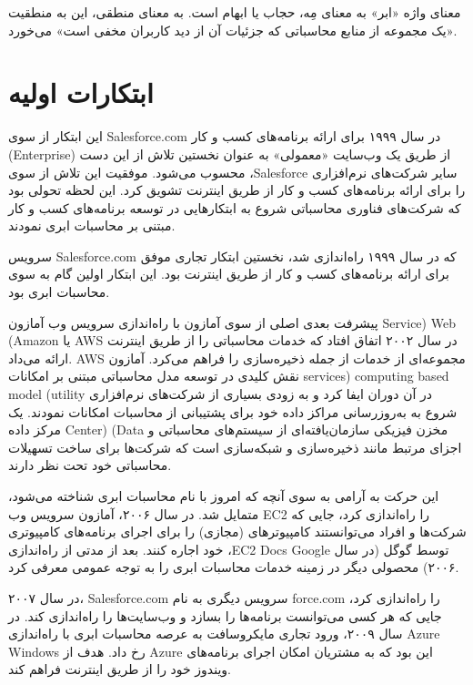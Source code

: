 \documentclass{book}
\begin{document}
            معنای واژه «ابر» به معنای مِه، حجاب یا ابهام است. به معنای منطقی، این به منطقیت «یک مجموعه از منابع محاسباتی که جزئیات آن از دید کاربران مخفی است» می‌خورد.

        \section{ابتکارات اولیه}

            این ابتکار از سوی Salesforce.com در سال ۱۹۹۹ برای ارائه برنامه‌های کسب و کار (Enterprise) از طریق یک وب‌سایت «معمولی» به عنوان نخستین تلاش از این دست محسوب می‌شود. موفقیت این تلاش از سوی ،Salesforce سایر شرکت‌های نرم‌افزاری را برای ارائه برنامه‌های کسب و کار از طریق اینترنت تشویق کرد. این لحظه تحولی بود که شرکت‌های فناوری محاسباتی شروع به ابتکار‌هایی در توسعه برنامه‌های کسب و کار مبتنی بر محاسبات ابری نمودند.

            \begin{addinfo}
                
                سرویس Salesforce.com که در سال ۱۹۹۹ راه‌اندازی شد، نخستین ابتکار تجاری موفق برای ارائه برنامه‌های کسب و کار از طریق اینترنت بود. این ابتکار اولین گام به سوی محاسبات ابری بود.

            \end{addinfo}

            پیشرفت بعدی اصلی از سوی آمازون با راه‌اندازی سرویس وب آمازون Service) Web (Amazon یا AWS در سال ۲۰۰۲ اتفاق افتاد که خدمات محاسباتی را از طریق اینترنت ارائه می‌داد. AWS مجموعه‌ای از خدمات از جمله ذخیره‌سازی را فراهم می‌کرد. آمازون نقش کلیدی در توسعه مدل محاسباتی مبتنی بر امکانات services) computing based model (utility در آن دوران ایفا کرد و به زودی بسیاری از شرکت‌های نرم‌افزاری شروع به به‌روزرسانی مراکز داده خود برای پشتیبانی از محاسبات امکانات نمودند. یک مرکز داده Center) (Data مخزن فیزیکی سازمان‌یافته‌ای از سیستم‌های محاسباتی و اجزای مرتبط مانند ذخیره‌سازی و شبکه‌سازی است که شرکت‌ها برای ساخت تسهیلات محاسباتی خود تحت نظر دارند.

            این حرکت به آرامی به سوی آنچه که امروز با نام محاسبات ابری شناخته می‌شود، متمایل شد. در سال ۲۰۰۶، آمازون سرویس وب EC2 را راه‌اندازی کرد، جایی که شرکت‌ها و افراد می‌توانستند کامپیوترهای (مجازی) را برای اجرای برنامه‌های کامپیوتری خود اجاره کنند. بعد از مدتی از راه‌اندازی ،EC2 Docs Google توسط گوگل (در سال ۲۰۰۶) محصولی دیگر در زمینه خدمات محاسبات ابری را به توجه عمومی معرفی کرد.

            در سال ۲۰۰۷، Salesforce.com سرویس دیگری به نام force.com را راه‌اندازی کرد، جایی که هر کسی می‌توانست برنامه‌ها را بسازد و وب‌سایت‌ها را راه‌اندازی کند. در سال ۲۰۰۹، ورود تجاری مایکروسافت به عرصه محاسبات ابری با راه‌اندازی Azure Windows رخ داد. هدف از Azure این بود که به مشتریان امکان اجرای برنامه‌های ویندوز خود را از طریق اینترنت فراهم کند.
\end{document}
